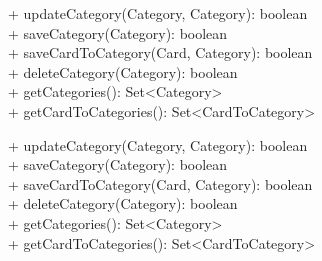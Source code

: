 {
    + updateCategory(Category, Category): boolean \\
    + saveCategory(Category): boolean \\
    + saveCardToCategory(Card, Category): boolean \\
    + deleteCategory(Category): boolean \\
    + getCategories(): Set<Category> \\
    + getCardToCategories(): Set<CardToCategory> \\
}{}


    + updateCategory(Category, Category): boolean \\
    + saveCategory(Category): boolean \\
    + saveCardToCategory(Card, Category): boolean \\
    + deleteCategory(Category): boolean \\
    + getCategories(): Set<Category> \\
    + getCardToCategories(): Set<CardToCategory> \\